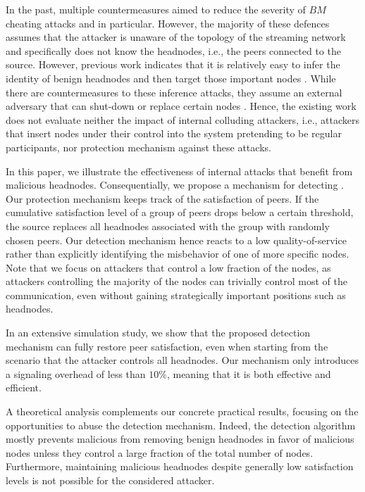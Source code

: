 In the past, multiple countermeasures aimed to reduce the severity of $BM$ cheating attacks and \drop in particular. However, the majority of these defences \cite{zhang2005coolstreaming, defending2, antiliar} assumes that the attacker is unaware of the topology of the streaming network and specifically does not know the headnodes, i.e., the peers connected to the source. 
However, previous work indicates that it is relatively easy to infer the identity of benign headnodes and then target those important nodes \cite{nguyen2016swap}.
While there are countermeasures to these inference attacks, they assume an external adversary that can shut-down or replace certain nodes \cite{nguyen2016swap, rbcs, nguyen2014resilience}. 
Hence, the existing work does not evaluate neither the impact of internal colluding attackers, i.e., attackers that insert nodes under their control into the system pretending to be regular participants, nor protection mechanism against these attacks. 


In this paper, we  illustrate the effectiveness of internal attacks that benefit from malicious headnodes. 
Consequentially, we propose a mechanism for detecting \drop. Our protection mechanism keeps track of the satisfaction of peers. If the cumulative satisfaction level of a group of peers drops below a certain threshold, the source replaces all headnodes associated with the group with randomly chosen peers. Our detection mechanism hence reacts to a low quality-of-service rather than explicitly identifying the misbehavior of one of more specific nodes.
Note that we focus on attackers that control a low fraction of the nodes, as attackers controlling the majority of the nodes can trivially control most of the communication, even without gaining strategically important positions such as headnodes.    

In an extensive simulation study, we show that the proposed detection mechanism can fully restore peer satisfaction, even when starting from the scenario that  the attacker controls all headnodes. 
Our mechanism only introduces a signaling overhead of less than $10\%$, meaning that it is both effective and efficient.

A theoretical analysis complements our concrete practical results, focusing on the opportunities to abuse the detection mechanism. 
Indeed, the detection algorithm mostly prevents malicious from removing benign headnodes in favor of malicious nodes unless they control a large fraction of the total number of nodes. 
Furthermore, maintaining malicious headnodes despite generally low satisfaction levels is not possible for the considered attacker. 
  



